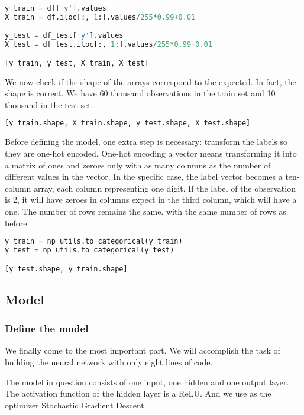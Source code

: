 \begin{lstlisting}[language=Python]
y_train = df['y'].values
X_train = df.iloc[:, 1:].values/255*0.99+0.01

y_test = df_test['y'].values
X_test = df_test.iloc[:, 1:].values/255*0.99+0.01

[y_train, y_test, X_train, X_test]
\end{lstlisting}

We now check if the shape of the arrays correspond to the expected. In fact, the shape is correct. We have 60 thousand observations in the train set and 10 thousand in the test set.

\begin{lstlisting}[language=Python]
[y_train.shape, X_train.shape, y_test.shape, X_test.shape]
\end{lstlisting}

Before defining the model, one extra step is necessary: transform the labels so they are one-hot encoded. One-hot encoding a vector means transforming it into a matrix of ones and zeroes only with as many columns as the number of different values in the vector. In the specific case, the label vector becomes a ten-column array, each column representing one digit. If the label of the observation is 2, it will have zeroes in columns expect in the third column, which will have a one. The number of rows remains the same. with the same number of rows as before.

\begin{lstlisting}[language=Python]
y_train = np_utils.to_categorical(y_train)
y_test = np_utils.to_categorical(y_test)

[y_test.shape, y_train.shape]
\end{lstlisting}

\subsection{Model}

\subsubsection{Define the model}

We finally come to the most important part. We will accomplish the task of building the neural network with only eight lines of code.

The model in question consists of one input, one hidden and one output layer. The activation function of the hidden layer is a ReLU. And we use as the optimizer Stochastic Gradient Descent. 

